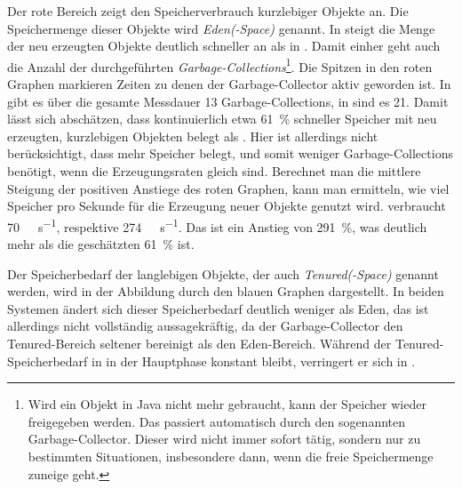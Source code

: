 Der rote Bereich zeigt den Speicherverbrauch kurzlebiger Objekte an. Die Speichermenge dieser Objekte wird \emph{Eden(-Space)} genannt. In \sysB{} steigt die Menge der neu erzeugten Objekte deutlich schneller an als in \sysA{}. Damit einher geht auch die Anzahl der durchgeführten \emph{Garbage-Collections}\footnote{Wird ein Objekt in Java nicht mehr gebraucht, kann der Speicher wieder freigegeben werden. Das passiert automatisch durch den sogenannten Garbage-Collector. Dieser wird nicht immer sofort tätig, sondern nur zu bestimmten Situationen, insbesondere dann, wenn die freie Speichermenge zuneige geht.}. Die Spitzen in den roten Graphen markieren Zeiten zu denen der Garbage-Collector aktiv geworden ist. In \sysA{} gibt es über die gesamte Messdauer 13 Garbage-Collections, in \sysB{} sind es 21. Damit lässt sich abschätzen, dass \sysB{} kontinuierlich etwa \SI{61}{\percent} schneller Speicher mit neu erzeugten, kurzlebigen Objekten belegt als \sysA{}. Hier ist allerdings nicht berücksichtigt, dass \sysB{} mehr Speicher belegt, und somit weniger Garbage-Collections benötigt, wenn die Erzeugungsraten gleich sind. Berechnet man die mittlere Steigung der positiven Anstiege des roten Graphen, kann man ermitteln, wie viel Speicher pro Sekunde für die Erzeugung neuer Objekte genutzt wird. \sysA{} verbraucht \SI{70}{\mega\byte\per\second}, \sysB{} respektive \SI{274}{\mega\byte\per\second}. Das ist ein Anstieg von \SI{291}{\percent}, was deutlich mehr als die geschätzten \SI{61}{\percent} ist.

Der Speicherbedarf der langlebigen Objekte, der auch \emph{Tenured(-Space)} genannt werden, wird in der Abbildung durch den blauen Graphen dargestellt. In beiden Systemen ändert sich dieser Speicherbedarf deutlich weniger als Eden, das ist allerdings nicht vollständig aussagekräftig, da der Garbage-Collector den Tenured-Bereich seltener bereinigt als den Eden-Bereich. Während der Tenured-Speicherbedarf in \sysB{} in der Hauptphase konstant bleibt, verringert er sich in \sysA{}. 